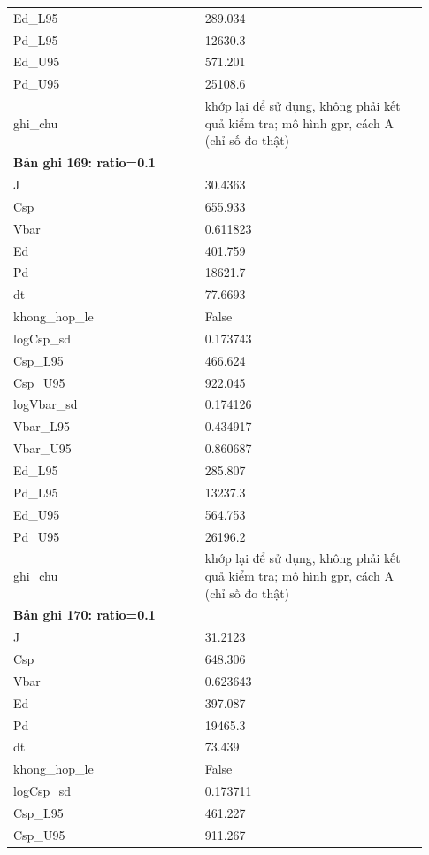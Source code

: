 \begin{longtable}{p{0.43\linewidth}p{0.50\linewidth}}
Ed\_\allowbreak L95 & 289.034 \\
Pd\_\allowbreak L95 & 12630.3 \\
Ed\_\allowbreak U95 & 571.201 \\
Pd\_\allowbreak U95 & 25108.6 \\
ghi\_\allowbreak chu & khớp lại để sử dụng, không phải kết quả kiểm tra; mô hình gpr, cách A (chỉ số đo thật) \\
\midrule
\multicolumn{2}{p{0.95\linewidth}}{\textbf{Bản ghi 169: ratio=0.1}} \\
J & 30.4363 \\
Csp & 655.933 \\
Vbar & 0.611823 \\
Ed & 401.759 \\
Pd & 18621.7 \\
dt & 77.6693 \\
khong\_\allowbreak hop\_\allowbreak le & False \\
logCsp\_\allowbreak sd & 0.173743 \\
Csp\_\allowbreak L95 & 466.624 \\
Csp\_\allowbreak U95 & 922.045 \\
logVbar\_\allowbreak sd & 0.174126 \\
Vbar\_\allowbreak L95 & 0.434917 \\
Vbar\_\allowbreak U95 & 0.860687 \\
Ed\_\allowbreak L95 & 285.807 \\
Pd\_\allowbreak L95 & 13237.3 \\
Ed\_\allowbreak U95 & 564.753 \\
Pd\_\allowbreak U95 & 26196.2 \\
ghi\_\allowbreak chu & khớp lại để sử dụng, không phải kết quả kiểm tra; mô hình gpr, cách A (chỉ số đo thật) \\
\midrule
\multicolumn{2}{p{0.95\linewidth}}{\textbf{Bản ghi 170: ratio=0.1}} \\
J & 31.2123 \\
Csp & 648.306 \\
Vbar & 0.623643 \\
Ed & 397.087 \\
Pd & 19465.3 \\
dt & 73.439 \\
khong\_\allowbreak hop\_\allowbreak le & False \\
logCsp\_\allowbreak sd & 0.173711 \\
Csp\_\allowbreak L95 & 461.227 \\
Csp\_\allowbreak U95 & 911.267 \\

\end{longtable}
